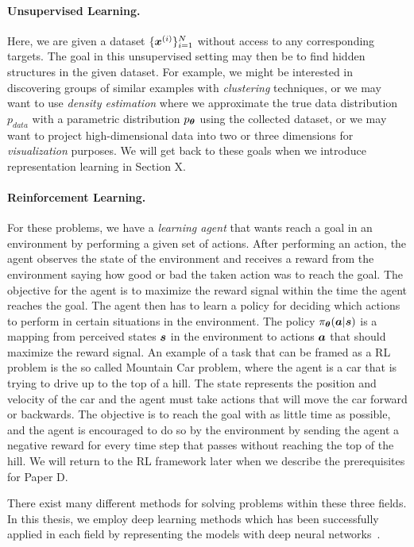 \paragraph{Unsupervised Learning.} Here, we are given a dataset $\{{\bm{x}}^{(i)}\}_{i=1}^{N}$ without access to any corresponding targets. The goal in this unsupervised setting may then be to find hidden structures in the given dataset. For example, we might be interested in discovering groups of similar examples with \textit{clustering} techniques, or we may want to use \textit{density estimation} where we approximate the true data distribution $p_{data}$ with a parametric distribution $p_{{\bm{\theta}}}$ using the collected dataset, or we may want to project high-dimensional data into two or three dimensions for \textit{visualization} purposes. We will get back to these goals when we introduce representation learning in Section X. 

\paragraph{Reinforcement Learning.} For these problems, we have a \textit{learning agent} that wants reach a goal in an environment by performing a given set of actions. After performing an action, the agent observes the state of the environment and receives a reward from the environment saying how good or bad the taken action was to reach the goal. The objective for the agent is to maximize the reward signal within the time the agent reaches the goal. The agent then has to learn a policy for deciding which actions to perform in certain situations in the environment. The policy $\pi_{{\bm{\theta}}}({\bm{a}} | {\bm{s}})$ is a mapping from perceived states ${\bm{s}}$ in the environment to actions ${\bm{a}}$ that should maximize the reward signal. An example of a task that can be framed as a RL problem is the so called Mountain Car problem, where the agent is a car that is trying to drive up to the top of a hill. The state represents the position and velocity of the car and the agent must take actions that will move the car forward or backwards. The objective is to reach the goal with as little time as possible, and the agent is encouraged to do so by the environment by sending the agent a negative reward for every time step that passes without reaching the top of the hill. We will return to the RL framework later when we describe the prerequisites for Paper D. \vspace{1mm}

There exist many different methods for solving problems within these three fields. In this thesis, we employ deep learning methods which has been successfully applied in each field by representing the models with deep neural networks~\cite{he2016deep, bengio2013representation, mnih2015human}.

